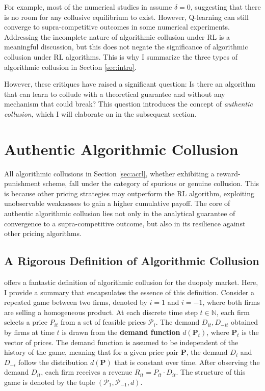 \documentclass[mnsc,nonblindrev]{workingpaper}
\begin{document}
For example, most of the numerical studies in \cite{asker2022artificial} assume $\delta=0$, suggesting that there is no room for any collusive equilibrium to exist. However, Q-learning can still converge to supra-competitive outcomes in some numerical experiments. Addressing the incomplete nature of algorithmic collusion under RL is a meaningful discussion, but this does not negate the significance of algorithmic collusion under RL algorithms. This is why I summarize the three types of algorithmic collusion in Section \ref{sec:intro}. 

However, these critiques have raised a significant question: Is there an algorithm that can learn to collude with a theoretical guarantee and without any mechanism that could break? This question introduces the concept of \textit{authentic collusion}, which I will elaborate on in the subsequent section.

\section{Authentic Algorithmic Collusion}
\label{sec:authentic}

All algorithmic collusions in Section \ref{sec:acrl}, whether exhibiting a reward-punishment scheme, fall under the category of spurious or genuine collusion. This is because other pricing strategies may outperform the RL algorithm, exploiting unobservable weaknesses to gain a higher cumulative payoff. The core of authentic algorithmic collusion lies not only in the analytical guarantee of convergence to a supra-competitive outcome, but also in its resilience against other pricing algorithms. 

\subsection{A Rigorous Definition of Algorithmic Collusion}
\label{subsec:rigorous}

\cite{den2023mathematical} offers a fantastic definition of algorithmic collusion for the duopoly market. Here, I provide a summary that encapsulates the essence of this definition. Consider a repeated game between two firms, denoted by $i = 1$ and $i = -1$, where both firms are selling a homogeneous product. At each discrete time step $t \in \mathbb{N}$, each firm selects a price $P_{it}$ from a set of feasible prices $\mathcal{P}_i$. The demand $D_{it}, D_{-it}$ obtained by firms at time $t$ is drawn from the \textbf{demand function} $d(\mathbf{P}_t)$, where $\mathbf{P}_t$ is the vector of prices. The demand function is assumed to be independent of the history of the game, meaning that for a given price pair $\mathbf{P}$, the demand $D_i$ and $D_{-i}$ follow the distribution $d(\mathbf{P})$ that is constant over time. After observing the demand $D_{it}$, each firm receives a revenue $R_{it} = P_{it} \cdot D_{it}$. The structure of this game is denoted by the tuple $(\mathcal{P}_1, \mathcal{P}_{-1}, d)$.
\end{document}

